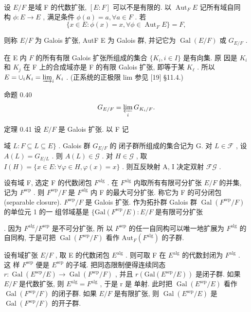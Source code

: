\documentclass[]{article}
\begin{document}
{设 $E / F$ 是域 F 的代数扩张, $[ E : F ]$ 可以不是有限的. 以 $\operatorname { A u t } _ { F } E$ 记所有域自同 构 $\phi : E \to E$ , 满足条件 $\phi ( a ) = a , \forall a \in F$ . 若 $$
\{x \in E: \phi (x) = x, \forall \phi \in \operatorname{Aut} _ {F} E \} = F,
$$

则称 $E / F$ 为 Galois 扩张, AutF E 为 Galois 群, 并记它为 $\operatorname { G a l } ( E / F )$ 或 $G _ { E / F }$ . 

在 E 内 $F$ 的所有有限 Galois 扩张所组成的集合 $\{ K _ { i } , i \in I \}$ 是有向集. 原 因是 $K _ { i }$ 和 $K _ { j }$ 在 F 上的合成域亦是 F 的有限 Galois 扩张, 即等于某 $K _ { \ell }$ . 所以 $E = \cup _ { i } K _ { i } = \varinjlim _ { i } K _ { i }$ . (正系统的正极限 lim 参见 [19] §11.4.) 

命题 0.40 $$
G _ {E / F} = \varprojlim_ {i} G _ {K _ {i} / F}.
$$

定理 0.41 设 $E / F$ 是 Galois 扩张. 以 F 记 {域 $L : F \subseteq L \subseteq E \}$ . Galois 群 $G _ { E / F }$ 的 闭子群所组成的集合记为 G. 对 $L \in \mathcal { F }$ , 设 $A ( L ) = G _ { E / L }$ . 则 $A ( L ) \in { \mathcal { G } }$ . 对 $H \in { \mathcal { G } }$ , 取 $I ( H ) = \{ x \in E : \forall \varphi \in H , \varphi ( x ) = x \}$ . 则互反映射 A, I 决定双射 $\mathcal { F }  \mathcal { G }$ . 

设有域 F, 选定 F 的代数闭包 $F ^ { \mathrm { a l g } }$ . 在 $F ^ { \mathrm { a l g } }$ 内取所有有限可分扩张 $E / F$ 的并集, 记为 $F ^ { \mathrm { s e p } }$ . 则 $F ^ { \mathrm { s e p } } / F$ 是 $F ^ { \mathrm { a l g } }$ 内 F 的最大可分扩张. 称它为 F 的可分闭包 (separable closure). $F ^ { \mathrm { s e p } } / F$ 是 Galois 扩张. 作为拓扑群 Galois 群 $\operatorname { G a l } ( F ^ { \mathrm { s e p } } / F )$ 的单位元 1 的一 组邻域基是 $\{ \mathrm { G a l } ( F ^ { \mathrm { s e p } } / E ) : E / F$ 是有限可分扩张}. 因为 $F ^ { \mathrm { a l g } } / F ^ { \mathrm { s e p } }$ 是不可分扩张, 所 以 $F ^ { \mathrm { s e p } }$ 的任一自同构可以唯一地扩展为 $F ^ { \mathrm { a l g } }$ 的自同构, 于是可把 $\operatorname { G a l } ( F ^ { \mathrm { s e p } } / F )$ 看作 $\mathrm { A u t } _ { F } ( F ^ { \mathrm { a l g } } )$ 的子群. 

设有域扩张 $E / F$ , 取 E 的代数闭包 $E ^ { \mathrm { a l g } }$ . 则可取 F 在 $E ^ { \mathrm { a l g } }$ 的代数封闭为 $F ^ { \mathrm { a l g } }$ . 这 样 $F ^ { \mathrm { s e p } }$ 便是 $E ^ { \mathrm { s e p } }$ 的子域. 把同态限制便得连续同态 $r : \operatorname { G a l } ( E ^ { \mathrm { s e p } } / E ) \to \operatorname { G a l } ( F ^ { \mathrm { s e p } } / F )$ , 并且 $r ( \mathrm { G a l } ( E ^ { \mathrm { s e p } } / E ) )$ 是闭子群. 如果 $E / F$ 是代数扩张, 则 $E ^ { \mathrm { a l g } } = F ^ { \mathrm { a l g } }$ , 于是 r 是 单射. 此时把 $\operatorname { G a l } ( E ^ { \mathrm { s e p } } / E )$ 看作 $\operatorname { G a l } ( F ^ { \mathrm { s e p } } / F )$ 的闭子群. 如果 $E / F$ 是有限扩张, 则 $\operatorname { G a l } ( E ^ { \mathrm { s e p } } / E )$ 是 $\operatorname { G a l } ( F ^ { \mathrm { s e p } } / F )$ 的开子群. 

}
\end{document}

